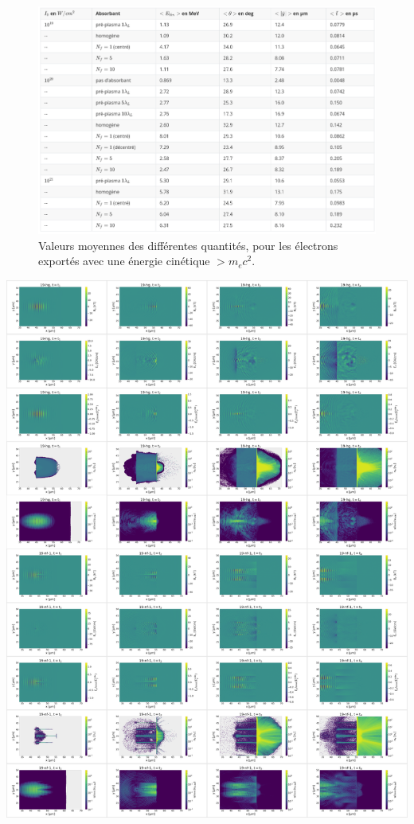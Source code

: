 \newpage

\begin{figure}[h]
    \centering
    \includegraphics[width=\linewidth]{8-annexes/tableau_quantites_moyennes.png}
    \caption{Valeurs moyennes des différentes quantités, pour les électrons exportés avec une énergie cinétique $>m_e c^2$.}
\end{figure}

\newpage

\hspace{-2cm}\includegraphics[width=1.2\linewidth]{8-annexes/absorber_19_p1.png}
\newpage

